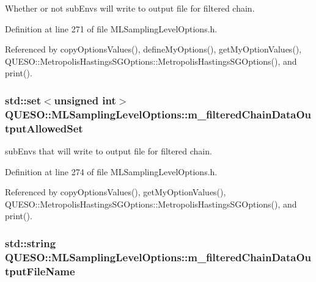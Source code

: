 Whether or not sub\-Envs will write to output file for filtered chain. 



Definition at line 271 of file M\-L\-Sampling\-Level\-Options.\-h.



Referenced by copy\-Options\-Values(), define\-My\-Options(), get\-My\-Option\-Values(), Q\-U\-E\-S\-O\-::\-Metropolis\-Hastings\-S\-G\-Options\-::\-Metropolis\-Hastings\-S\-G\-Options(), and print().

\hypertarget{class_q_u_e_s_o_1_1_m_l_sampling_level_options_a12bf1b2424e791608d3dcd1254c3eef2}{
\subsubsection[{m\-\_\-filtered\-Chain\-Data\-Output\-Allowed\-Set}]{\setlength{\rightskip}{0pt plus 5cm}std\-::set$<$unsigned int$>$ Q\-U\-E\-S\-O\-::\-M\-L\-Sampling\-Level\-Options\-::m\-\_\-filtered\-Chain\-Data\-Output\-Allowed\-Set}}\label{class_q_u_e_s_o_1_1_m_l_sampling_level_options_a12bf1b2424e791608d3dcd1254c3eef2}


sub\-Envs that will write to output file for filtered chain. 



Definition at line 274 of file M\-L\-Sampling\-Level\-Options.\-h.



Referenced by copy\-Options\-Values(), get\-My\-Option\-Values(), Q\-U\-E\-S\-O\-::\-Metropolis\-Hastings\-S\-G\-Options\-::\-Metropolis\-Hastings\-S\-G\-Options(), and print().

\hypertarget{class_q_u_e_s_o_1_1_m_l_sampling_level_options_abf333c405ee097104ee9b1b1e92ecd97}{
\subsubsection[{m\-\_\-filtered\-Chain\-Data\-Output\-File\-Name}]{\setlength{\rightskip}{0pt plus 5cm}std\-::string Q\-U\-E\-S\-O\-::\-M\-L\-Sampling\-Level\-Options\-::m\-\_\-filtered\-Chain\-Data\-Output\-File\-Name}}\label{class_q_u_e_s_o_1_1_m_l_sampling_level_options_abf333c405ee097104ee9b1b1e92ecd97}


